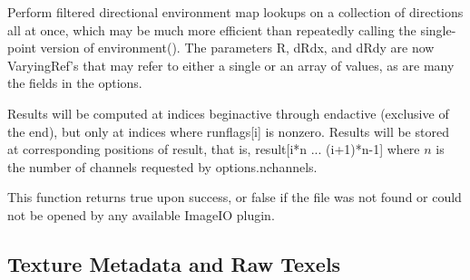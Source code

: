 
Perform filtered directional environment map lookups on a collection of
directions all at once, which may be much more efficient than repeatedly
calling the single-point version of {\cf environment()}.  The parameters
{\cf R}, {\cf dRdx}, and {\cf dRdy} are now {\cf VaryingRef}'s that may
refer to either a single or an array of values, as are many the fields in
the {\cf options}.

Results will be computed at indices {\cf beginactive} through
{\cf endactive} (exclusive of the end), but only at indices where {\cf runflags[i]}
is nonzero.  Results will be stored at corresponding positions of
{\cf result}, that is, {\cf result[i*n ... (i+1)*n-1]} where $n$ 
is the number of channels requested by {\cf options.nchannels}.

This function returns {\cf true} upon success, or {\cf false} if the
file was not found or could not be opened by any available ImageIO
plugin.
\apiend

\subsection{Texture Metadata and Raw Texels}
\label{sec:texturesys:api:gettextureinfo}
\label{sec:texturesys:api:getimagespec}

